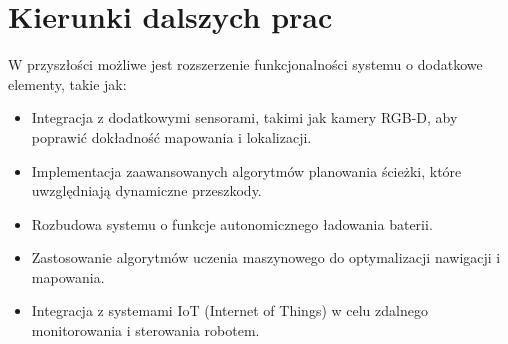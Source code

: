 \documentclass[a4paper,twoside,12pt]{book}
\begin{document}
\section{Kierunki dalszych prac}
W przyszłości możliwe jest rozszerzenie funkcjonalności systemu o dodatkowe elementy, takie jak:
\begin{itemize}
	\item Integracja z dodatkowymi sensorami, takimi jak kamery RGB-D, aby poprawić dokładność mapowania i lokalizacji.
	\item Implementacja zaawansowanych algorytmów planowania ścieżki, które uwzględniają dynamiczne przeszkody.
	\item Rozbudowa systemu o funkcje autonomicznego ładowania baterii.
	\item Zastosowanie algorytmów uczenia maszynowego do optymalizacji nawigacji i mapowania.
	\item Integracja z systemami IoT (Internet of Things) w celu zdalnego monitorowania i sterowania robotem.
\end{itemize}



\backmatter
\end{document}
